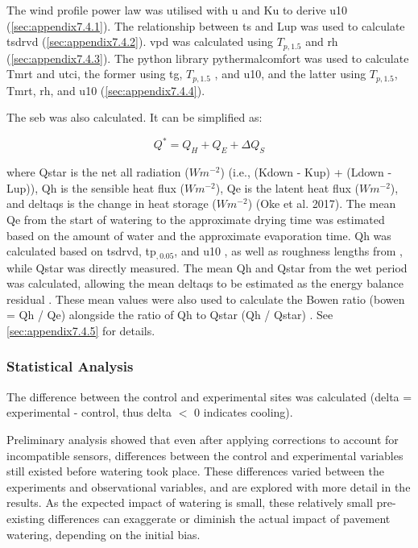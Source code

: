 \documentclass[final,3p,times,authoryear]{elsarticle}
\begin{document}
The wind profile power law \citep{Manwell2010,Banuelos-Ruedas2010} was
utilised with \gls{u} and \gls{Ku}  to derive \gls{u10} (\ref{sec:appendix7.4.1}). The relationship between \gls{ts} and \gls{Lup} \citep{Oke2017} was used to calculate \gls{tsdrvd} (\ref{sec:appendix7.4.2}). \gls{vpd} was calculated using $T_{p,1.5}$ and \gls{rh} \citep{Allen1998,McMahon2013} (\ref{sec:appendix7.4.3}). The python library pythermalcomfort \citep{Tartarini2020} was used to calculate \gls{Tmrt} and \gls{utci}, the former using \gls{tg}, $T_{p,1.5}$ , and \gls{u10}, and the latter using $T_{p,1.5}$, \gls{Tmrt}, \gls{rh}, and \gls{u10} (\ref{sec:appendix7.4.4}).

The \gls{seb} was also calculated. It can be simplified as:

\begin{equation}
Q^{*} = Q_{H} + Q_{E} + \Delta Q_{S}
\label{eq:2.1} 
\end{equation}

where \gls{Qstar} is the net all radiation ($Wm^{-2}$) (i.e., (\gls{Kdown} - \gls{Kup}) + (\gls{Ldown} - \gls{Lup})), \gls{Qh} is the sensible heat flux ($Wm^{-2}$), \gls{Qe} is the latent heat flux ($Wm^{-2}$), and \gls{deltaqs} is the change in heat storage ($Wm^{-2}$) (Oke et al. 2017). The mean \gls{Qe} from the start of watering to the approximate drying time was estimated based on the amount of water and the approximate evaporation time. \gls{Qh} was calculated based on \gls{tsdrvd}, \gls{tp}$_{,0.05}$, and \gls{u10} \citep{Liu2007}, as well as roughness lengths from \cite{Kanda2007}, while \gls{Qstar} was directly measured. The mean \gls{Qh} and \gls{Qstar} from the wet period was calculated, allowing the mean \gls{deltaqs} to be estimated as the energy balance residual \citep{Oke2017}. These mean values were also used to calculate the Bowen ratio (\gls{bowen} = \gls{Qh} / \gls{Qe}) alongside the ratio of \gls{Qh} to \gls{Qstar} (\gls{Qh} / \gls{Qstar}) \citep{Oke2017}. See \ref{sec:appendix7.4.5} for details.


\subsubsection{Statistical Analysis}\label{sec:methods2.2.3}

The difference between the control and experimental sites was calculated (\gls{delta} =
experimental - control, thus \gls{delta} $<$ 0 indicates cooling).

Preliminary analysis showed that even after applying corrections to account for
incompatible sensors, differences between the control and experimental variables still
existed before watering took place. These differences varied between the experiments
and observational variables, and are explored with more detail in the results. As the
expected impact of watering is small, these relatively small pre-existing differences can
exaggerate or diminish the actual impact of pavement watering, depending on the initial
bias.
\end{document}
